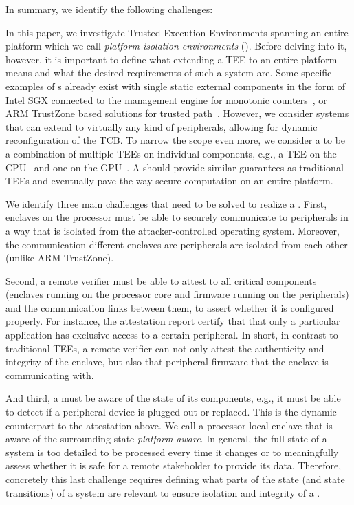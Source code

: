  In summary, we identify the following challenges:





In this paper, we investigate Trusted Execution Environments spanning an entire platform which we call \emph{platform isolation environments} (\name{}). Before delving into it, however, it is important to define what extending a TEE to an entire platform means and what the desired requirements of such a system are. Some specific examples of \name{}s already exist with single static external components in the form of Intel SGX connected to the management engine for monotonic counters~\cite{matetic2017rote}, or ARM TrustZone based solutions for trusted path~\cite{VButton,SeCloak}. However, we consider systems that can extend to virtually any kind of peripherals, allowing for dynamic reconfiguration of the TCB. To narrow the scope even more, we consider a \name to be a combination of multiple TEEs on individual components, e.g., a TEE on the CPU~\cite{keystone} and one on the GPU~\cite{volos2018graviton}. A \name{} should provide similar guarantees as traditional TEEs and eventually pave the way secure computation on an entire platform. %

We identify three main challenges that need to be solved to realize a \name{}. First, enclaves on the processor must be able to securely communicate to peripherals in a way that is isolated from the attacker-controlled operating system. Moreover, the communication different enclaves are peripherals are isolated from each other (unlike ARM TrustZone).

Second, a remote verifier must be able to attest to all critical components (enclaves running on the processor core and firmware running on the peripherals) and the communication links between them, to assert whether it is configured properly. For instance, the attestation report certify that that only a particular application has exclusive access to a certain peripheral. In short, in contrast to traditional TEEs, a remote verifier can not only attest the authenticity and integrity of the enclave, but also that peripheral firmware that the enclave is communicating with.


And third, a \name{} must be aware of the state of its components, e.g., it must be able to detect if a peripheral device is plugged out or replaced. This is the dynamic counterpart to the attestation above. We call a processor-local enclave that is aware of the surrounding state \emph{platform aware}. In general, the full state of a system is too detailed to be processed every time it changes or to meaningfully assess whether it is safe for a remote stakeholder to provide its data. Therefore, concretely this last challenge requires defining what parts of the state (and state transitions) of a system are relevant to ensure isolation and integrity of a \name.  %


